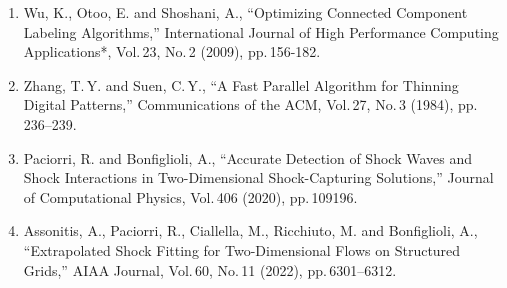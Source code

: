 \documentclass[a4j]{jarticle}
\begin{document}
\begin{enumerate}
  \item Wu, K., Otoo, E. and Shoshani, A., ``Optimizing Connected Component Labeling Algorithms,'' 
  International Journal of High Performance Computing Applications*, Vol.\,23, No.\,2 (2009), pp.\,156-182.  
  \label{ref:CCL}

  \item Zhang, T.\,Y. and Suen, C.\,Y., ``A Fast Parallel Algorithm for Thinning Digital Patterns,'' 
  Communications of the ACM, Vol.\,27, No.\,3 (1984), pp.\,236--239.
  \label{ref:skelton}

  \item Paciorri, R. and Bonfiglioli, A., ``Accurate Detection of Shock Waves and Shock Interactions in Two-Dimensional Shock-Capturing Solutions,'' 
  Journal of Computational Physics, Vol.\,406 (2020), pp.\,109196.
  \label{ref:intera}

  \item Assonitis, A., Paciorri, R., Ciallella, M., Ricchiuto, M. and Bonfiglioli, A., ``Extrapolated Shock Fitting for Two-Dimensional Flows on Structured Grids,'' 
  AIAA Journal, Vol.\,60, No.\,11 (2022), pp.\,6301--6312.
  \label{ref:SF}
\end{enumerate}
\end{document}
